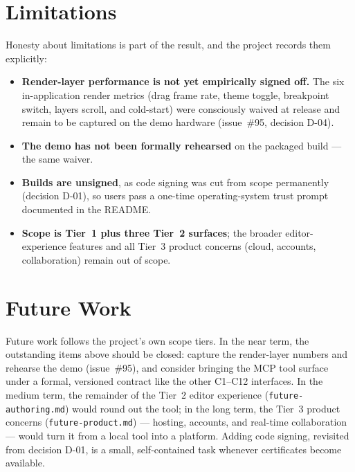 \section{Limitations}
Honesty about limitations is part of the result, and the project records them
explicitly:

\begin{itemize}[leftmargin=1.5em]
  \item \textbf{Render-layer performance is not yet empirically signed off.} The
        six in-application render metrics (drag frame rate, theme toggle,
        breakpoint switch, layers scroll, and cold-start) were consciously waived
        at release and remain to be captured on the demo hardware (issue~\#95,
        decision D-04).
  \item \textbf{The demo has not been formally rehearsed} on the packaged build
        --- the same waiver.
  \item \textbf{Builds are unsigned}, as code signing was cut from scope
        permanently (decision D-01), so users pass a one-time operating-system
        trust prompt documented in the README.
  \item \textbf{Scope is Tier~1 plus three Tier~2 surfaces}; the broader
        editor-experience features and all Tier~3 product concerns (cloud,
        accounts, collaboration) remain out of scope.
\end{itemize}

\section{Future Work}
Future work follows the project's own scope tiers. In the near term, the
outstanding items above should be closed: capture the render-layer numbers and
rehearse the demo (issue~\#95), and consider bringing the MCP tool surface under a
formal, versioned contract like the other C1--C12 interfaces. In the medium term,
the remainder of the Tier~2 editor experience (\texttt{future-authoring.md}) would
round out the tool; in the long term, the Tier~3 product concerns
(\texttt{future-product.md}) --- hosting, accounts, and real-time collaboration ---
would turn it from a local tool into a platform. Adding code signing, revisited
from decision D-01, is a small, self-contained task whenever certificates become
available.

